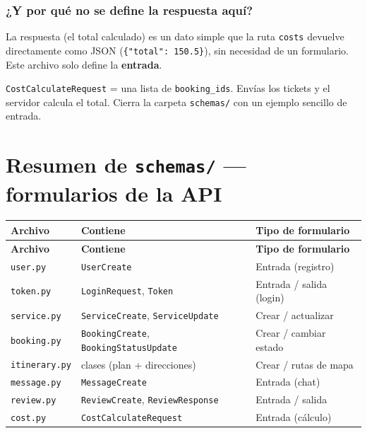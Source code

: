 \documentclass[11pt,a4paper]{article}
\begin{document}
\subsubsection{¿Y por qué no se define la \textbf{respuesta} aquí?}

La respuesta (el total calculado) es un dato simple que la ruta \texttt{costs} devuelve
directamente como JSON (\texttt{\{"total": 150.5\}}), sin necesidad de un formulario.
Este archivo solo define la \textbf{entrada}.

\begin{recuadro}
\texttt{CostCalculateRequest} = una lista de \texttt{booking\_ids}. Envías los tickets y el
servidor calcula el total. Cierra la carpeta \texttt{schemas/} con un ejemplo sencillo de entrada.
\end{recuadro}

\section{Resumen de \texttt{schemas/} --- formularios de la API}

\begin{center}
{\small
\setlength{\tabcolsep}{4pt}
\begin{longtable}{@{}>{\raggedright\arraybackslash}p{3.6cm}>{\raggedright\arraybackslash}p{6.4cm}>{\raggedright\arraybackslash}p{4.9cm}@{}}
\toprule
\textbf{Archivo} & \textbf{Contiene} & \textbf{Tipo de formulario} \\
\midrule
\endfirsthead
\toprule
\textbf{Archivo} & \textbf{Contiene} & \textbf{Tipo de formulario} \\
\midrule
\endhead
\texttt{user.py} & \texttt{UserCreate} & Entrada (registro) \\
\texttt{token.py} & \texttt{LoginRequest}, \texttt{Token} & Entrada / salida (login) \\
\texttt{service.py} & \texttt{ServiceCreate}, \texttt{ServiceUpdate} & Crear / actualizar \\
\texttt{booking.py} & \texttt{BookingCreate}, \texttt{BookingStatusUpdate} & Crear / cambiar estado \\
\texttt{itinerary.py} & 5 clases (plan + direcciones) & Crear / rutas de mapa \\
\texttt{message.py} & \texttt{MessageCreate} & Entrada (chat) \\
\texttt{review.py} & \texttt{ReviewCreate}, \texttt{ReviewResponse} & Entrada / salida \\
\texttt{cost.py} & \texttt{CostCalculateRequest} & Entrada (cálculo) \\
\bottomrule
\end{longtable}
}
\end{center}
\end{document}
